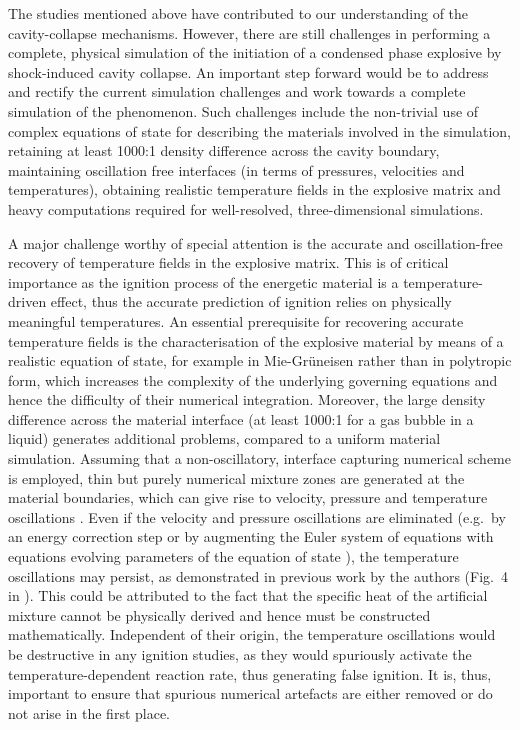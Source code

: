 \documentclass[3p,times,twocolumn]{elsarticle}
\begin{document}
The studies mentioned above have contributed to our understanding of the cavity-collapse mechanisms. However, there are still challenges in performing a complete, physical simulation of the initiation of a condensed phase explosive by shock-induced cavity collapse. An important step forward would be to address and rectify the current simulation challenges and work towards a complete simulation of the phenomenon. Such challenges include the non-trivial use of complex equations of state for describing the materials involved in the simulation, retaining at least 1000:1 density difference across the cavity boundary, maintaining oscillation free interfaces (in terms of pressures, velocities and temperatures), obtaining realistic temperature fields in the explosive matrix and heavy computations required for well-resolved, three-dimensional simulations.

A major challenge worthy of special attention is the accurate and oscillation-free recovery of temperature fields in the explosive matrix. This is of critical importance as the ignition process of the energetic material is a temperature-driven effect, thus the accurate prediction of ignition relies on physically meaningful temperatures. %
An essential prerequisite for recovering accurate temperature fields is the characterisation of the explosive material by means of a realistic equation of state, for example in Mie-Gr\"uneisen rather than in polytropic form, which increases the complexity of the underlying governing equations and hence the difficulty of their numerical integration. Moreover, the large density difference across the material interface (at least 1000:1 for a gas bubble in a liquid) generates additional problems, compared to a uniform material simulation. Assuming that a non-oscillatory, interface capturing numerical scheme is employed, thin but purely numerical mixture zones are generated at the material boundaries, which can give rise to velocity, pressure and temperature oscillations \cite{banks2007high,kapila2007study,michael2016hybrid}. Even if the velocity and pressure oscillations are eliminated  (e.g.\ by an energy correction step \cite{banks2007high,michael2016hybrid} or by augmenting the Euler system of equations with equations evolving parameters of the equation of state \cite{shyue1998efficient,shyue1999fluid,shyue2001fluid,wang2004thermodynamically}), the temperature oscillations may persist, as demonstrated in previous work by the authors (Fig.\ 4 in  \cite{michael2016hybrid}). 
This could be attributed to the fact that the specific heat of the artificial mixture cannot be physically derived and hence must be constructed mathematically. Independent of their origin, the temperature oscillations would be destructive in any ignition studies, as they would spuriously activate the temperature-dependent reaction rate, thus generating false ignition. It is, thus, important to ensure that spurious numerical artefacts are either removed or do not arise in the first place. 
\end{document}

